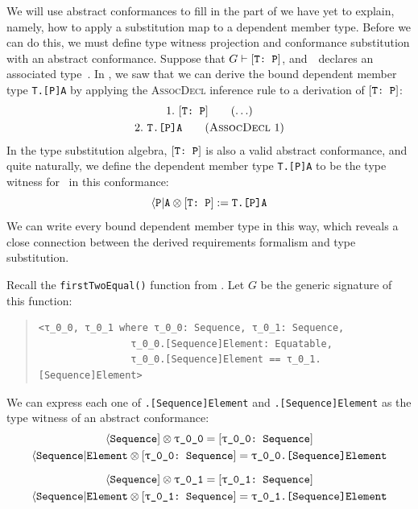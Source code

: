\documentclass[../generics]{subfiles}
\begin{document}
We will use abstract conformances to fill in the part of  we have yet to explain, namely, how to apply a substitution map to a dependent member type. Before we can do this, we must define type witness projection and conformance substitution with an abstract conformance. Suppose that $G\vdash[\texttt{T:~P}]$, and~\tP\ declares an associated type~\nA. In , we saw that we can derive the bound dependent member type \texttt{T.[P]A} by applying the \textsc{AssocDecl} inference rule to a derivation of $[\texttt{T:~P}]$:
\begin{gather*}
\AnyStep{\TP}{1}\\
\AssocDeclStep{1}{T.[P]A}{2}
\end{gather*}
In the type substitution algebra, $[\texttt{T:~P}]$ is also a valid abstract conformance, and quite naturally, we define the dependent member type \texttt{T.[P]A} to be the type witness for \nA\ in this conformance:
\[\langle\texttt{P}|\texttt{A} \otimes [\texttt{T:~P}] := \texttt{T.[P]A}\]
We can write every bound dependent member type in this way, which reveals a close connection between the derived requirements formalism and type substitution.
\begin{example}\label{abstract conformance example}
Recall the \texttt{firstTwoEqual()} function from . Let $G$ be the generic signature of this function:
\begin{quote}
\begin{verbatim}
<τ_0_0, τ_0_1 where τ_0_0: Sequence, τ_0_1: Sequence,
                τ_0_0.[Sequence]Element: Equatable,
                τ_0_0.[Sequence]Element == τ_0_1.[Sequence]Element>
\end{verbatim}
\end{quote}
We can express each one of \texttt{\rT.[Sequence]Element} and \texttt{\rU.[Sequence]Element} as the type witness of an abstract conformance:
\begin{gather*}
\PSequence \otimes \texttt{\rT} = \rTSequence\\
\AElement \otimes \rTSequence = \texttt{\rT.[Sequence]Element}\\[\medskipamount]
\PSequence \otimes \texttt{\rU} = \rUSequence\\
\AElement \otimes \rUSequence = \texttt{\rU.[Sequence]Element}
\end{gather*}
\end{example}
\end{document}
